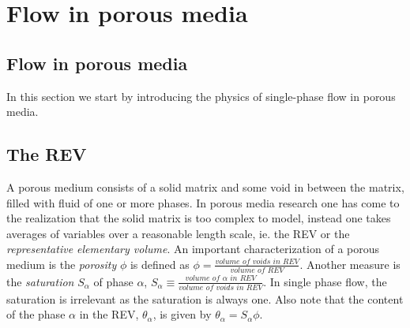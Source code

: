 \documentclass[../Main/main.tex]{subfiles}
\begin{document}
\graphicspath{{../Flow in porous media/figs/}}
\chapter{Flow in porous media}



\section*{Flow in porous media}
In this section we start by introducing the physics of single-phase flow in porous media.



\section*{The REV}\label{REV}
A porous medium consists of a solid matrix and some void in between the matrix, filled with fluid of one or more phases. In porous media research one has come to the realization that the solid matrix is too complex to model, instead one takes averages of variables over a reasonable length scale, ie. the REV or the \emph{representative elementary volume}.
An important characterization of a porous medium is the \emph{porosity} $\phi$ is defined as $\phi = \frac{\textit{volume of voids in REV}}{\textit{volume of REV}}$. Another measure is the \emph{saturation} $S_{\alpha}$ of phase $\alpha$,  $S_{\alpha} \equiv \frac{\textit{volume of }\alpha \textit{ in REV}}{\textit{volume of voids in REV}}$. In single phase flow, the saturation is irrelevant as the saturation is always one. Also note that the content of the phase $\alpha$ in the REV, $\theta_{\alpha}$, is given by $\theta_{\alpha} = S_{\alpha} \phi$.
\end{document}
